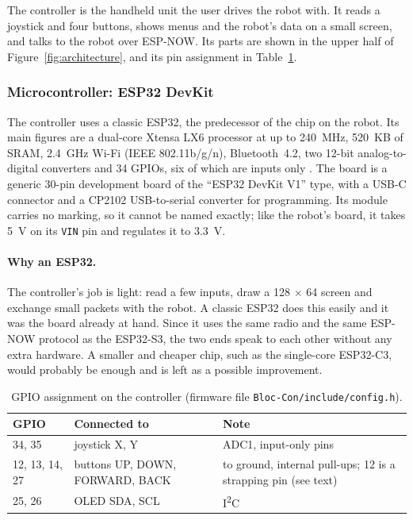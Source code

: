 The controller is the handheld unit the user drives the robot with. It reads a joystick
and four buttons, shows menus and the robot's data on a small screen, and talks to the
robot over ESP-NOW. Its parts are shown in the upper half of
Figure~\ref{fig:architecture}, and its pin assignment in Table~\ref{tab:con-pins}.

\subsubsection{Microcontroller: ESP32 DevKit}
The controller uses a classic ESP32, the predecessor of the chip on the robot. Its main
figures are a dual-core Xtensa LX6 processor at up to 240~MHz, 520~KB of SRAM, 2.4~GHz
Wi-Fi (IEEE 802.11b/g/n), Bluetooth~4.2, two 12-bit analog-to-digital converters and 34
GPIOs, six of which are inputs only \cite{esp32_datasheet}. The board is a generic
30-pin development board of the ``ESP32 DevKit V1'' type, with a USB-C connector and a
CP2102 USB-to-serial converter for programming. Its module carries no marking, so it
cannot be named exactly; like the robot's board, it takes 5~V on its \texttt{VIN} pin and
regulates it to 3.3~V.

\paragraph{Why an ESP32.} The controller's job is light: read a few inputs, draw a
128 \(\times\) 64 screen and exchange small packets with the robot. A classic ESP32 does
this easily and it was the board already at hand. Since it uses the same radio and the same
ESP-NOW protocol as the ESP32-S3, the two ends speak to each other without any extra
hardware. A smaller and cheaper chip, such as the single-core ESP32-C3, would probably
be enough and is left as a possible improvement.

\begin{table}[htbp]
  \centering
  \caption[GPIO assignment on the controller]{GPIO assignment on the controller (firmware file \texttt{Bloc-Con/include/config.h}).}
  \label{tab:con-pins}
  \begin{tabularx}{\textwidth}{@{}l l X@{}}
    \toprule
    GPIO & Connected to & Note \\
    \midrule
    34, 35 & joystick X, Y & ADC1, input-only pins \\
    12, 13, 14, 27 & buttons UP, DOWN, FORWARD, BACK & to ground, internal pull-ups;
                     12 is a strapping pin (see text) \\
    25, 26 & OLED SDA, SCL & I\textsuperscript{2}C \\
    \bottomrule
  \end{tabularx}
\end{table}

